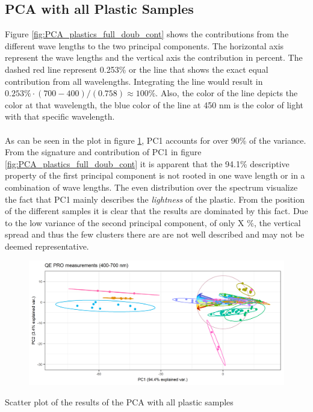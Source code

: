 \subsection{PCA with all Plastic Samples}
Figure \ref{fig:PCA_plastics_full_doub_cont} shows the contributions from the different wave lengths to the two principal components. The horizontal axis represent the wave lengths and the vertical axis the contribution in percent. The dashed red line represent 0.253\% or the line that shows the exact equal contribution from all wavelengths. Integrating the line would result in $0.253\% \cdot (700 - 400)/(0.758) \approx 100\%$.%
Also, the color of the line depicts the color at that wavelength, the blue color of the line at 450 nm is the color of light with that specific wavelength. 
\\\\%
As can be seen in the plot in figure \ref{fig:PCA_plastics_only_full_scat}, PC1 accounts for over 90\% of the variance. From the signature and contribution of PC1 in figure \ref{fig:PCA_plastics_full_doub_cont} it is apparent that the 94.1\% descriptive property of the first principal component is not rooted in one wave length or in a combination of wave lengths. The even distribution over the spectrum visualize the fact that PC1 mainly describes the \textit{lightness} of the plastic. From the position of the different samples it is clear that the results are dominated by this fact. Due to the low variance of the second principal component, of only X \%, the vertical spread and thus the few clusters there are are not well described and may not be deemed representative.

\begin{figure}[H]
    \centering
    \includegraphics[width=1\textwidth]{Images/results/PCA_plastics_full_only_scat.png}
    \label{fig:PCA_plastics_only_full_scat}
    \caption{}
\end{figure}
\begin{centering}
Scatter plot of the results of the PCA with all plastic samples
\end{centering}

